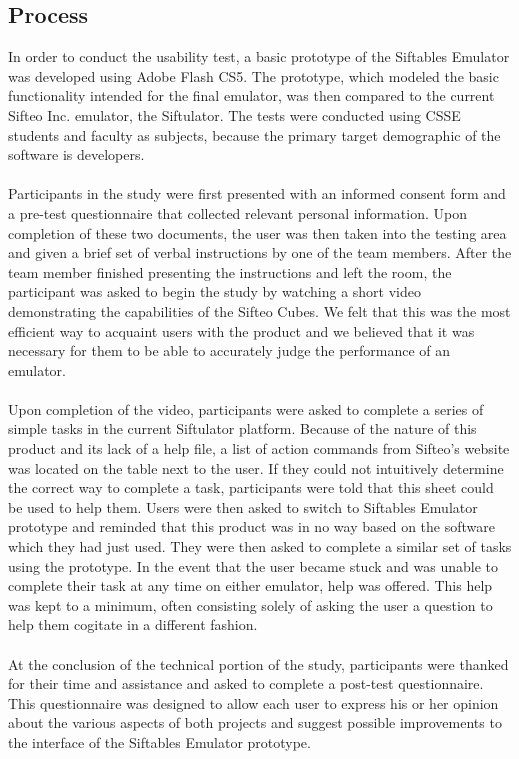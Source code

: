 \documentclass[12pt]{article}
\begin{document}
\subsection{Process}
In order to conduct the usability test, a basic prototype of the Siftables Emulator was developed using Adobe Flash CS5. The prototype, which modeled the basic functionality intended for the final emulator, was then compared to the current Sifteo Inc. emulator, the Siftulator. The tests were conducted using CSSE students and faculty as subjects, because the primary target demographic of the software is developers. \\\\
Participants in the study were first presented with an informed consent form and a pre-test questionnaire that collected relevant personal information. Upon completion of these two documents, the user was then taken into the testing area and given a brief set of verbal instructions by one of the team members. After the team member finished presenting the instructions and left the room, the participant was asked to begin the study by watching a short video demonstrating the capabilities of the Sifteo Cubes. We felt that this was the most efficient way to acquaint users with the product and we believed that it was necessary for them to be able to accurately judge the performance of an emulator. \\\\
Upon completion of the video, participants were asked to complete a series of simple tasks in the current Siftulator platform. Because of the nature of this product and its lack of a help file, a list of action commands from Sifteo's website was located on the table next to the user. If they could not intuitively determine the correct way to complete a task, participants were told that this sheet could be used to help them. Users were then asked to switch to Siftables Emulator prototype and reminded that this product was in no way based on the software which they had just used. They were then asked to complete a similar set of tasks using the prototype. In the event that the user became stuck and was unable to complete their task at any time on either emulator, help was offered. This help was kept to a minimum, often consisting solely of asking the user a question to help them cogitate in a different fashion. \\\\
At the conclusion of the technical portion of the study, participants were thanked for their time and assistance and asked to complete a post-test questionnaire. This questionnaire was designed to allow each user to express his or her opinion about the various aspects of both projects and suggest possible improvements to the interface of the Siftables Emulator prototype.
\end{document}
